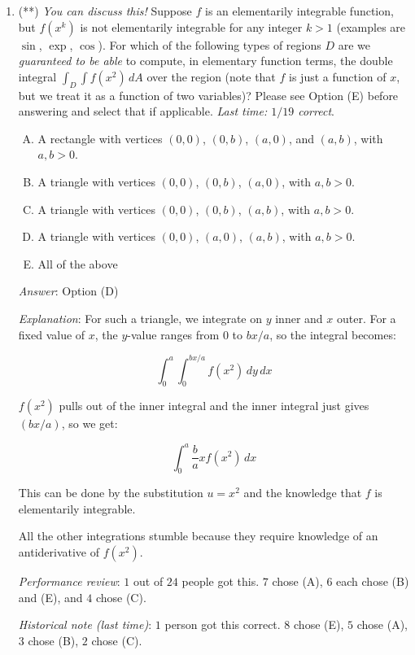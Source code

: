 \documentclass[10pt]{amsart}
\begin{document}
\begin{enumerate}
  {\em Performance review}: $20$ out of $24$ people got this. $2$
  chose (D), $1$ each chose (A) and (B).

  {\em Historical note (last time)}: $8$ out of $19$ people got this
  correct. $6$ people chose (D), $2$ each chose (A) and (E), $1$ chose
  (B).

\item (**) {\em You can discuss this!} Suppose $f$ is an elementarily
  integrable function, but $f(x^k)$ is not elementarily integrable for
  any integer $k > 1$ (examples are $\sin$, $\exp$, $\cos$). For which
  of the following types of regions $D$ are we {\em guaranteed to be
  able} to compute, in elementary function terms, the double integral
  $\int_D \int f(x^2) \, dA$ over the region (note that $f$ is just a
  function of $x$, but we treat it as a function of two variables)?
  Please see Option (E) before answering and select that if
  applicable.  {\em Last time: $1/19$ correct}.

  \begin{enumerate}[(A)]
  \item A rectangle with vertices $(0,0)$, $(0,b)$, $(a,0)$, and
    $(a,b)$, with $a,b > 0$.
  \item A triangle with vertices $(0,0)$, $(0,b)$, $(a,0)$, with $a, b
    > 0$.
  \item A triangle with vertices $(0,0)$, $(0,b)$, $(a,b)$, with $a, b
    > 0$.
  \item A triangle with vertices $(0,0)$, $(a,0)$, $(a,b)$, with $a, b
    > 0$.
  \item All of the above
  \end{enumerate}

  {\em Answer}: Option (D)

  {\em Explanation}: For such a triangle, we integrate on $y$ inner
  and $x$ outer. For a fixed value of $x$, the $y$-value ranges from
  $0$ to $bx/a$, so the integral becomes:

  $$\int_0^a \int_0^{bx/a} f(x^2) \, dy \, dx$$

  $f(x^2)$ pulls out of the inner integral and the inner integral
  just gives $(bx/a)$, so we get:

  $$\int_0^a \frac{b}{a} xf(x^2) \, dx$$

  This can be done by the substitution $u = x^2$ and the knowledge
  that $f$ is elementarily integrable.

  All the other integrations stumble because they require knowledge of
  an antiderivative of $f(x^2)$.

  {\em Performance review}: $1$ out of $24$ people got this. $7$ chose
  (A), $6$ each chose (B) and (E), and $4$ chose (C).

  {\em Historical note (last time)}: $1$ person got this correct. $8$
  chose (E), $5$ chose (A), $3$ chose (B), $2$ chose (C).

\end{enumerate}
\end{document}
